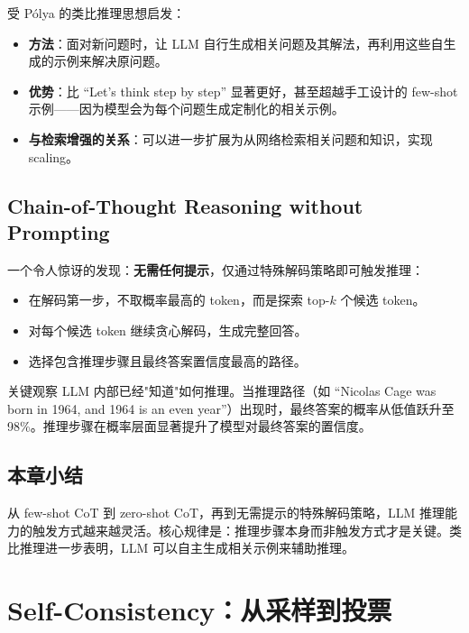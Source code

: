 \documentclass[a4paper]{article}
\begin{document}
受 P\'{o}lya 的类比推理思想启发：

\begin{itemize}
    \item \textbf{方法}：面对新问题时，让 LLM 自行生成相关问题及其解法，再利用这些自生成的示例来解决原问题。
    \item \textbf{优势}：比 ``Let's think step by step'' 显著更好，甚至超越手工设计的 few-shot 示例——因为模型会为每个问题生成定制化的相关示例。
    \item \textbf{与检索增强的关系}：可以进一步扩展为从网络检索相关问题和知识，实现 scaling。
\end{itemize}

\subsection{Chain-of-Thought Reasoning without Prompting}

一个令人惊讶的发现：\textbf{无需任何提示}，仅通过特殊解码策略即可触发推理：

\begin{itemize}
    \item 在解码第一步，不取概率最高的 token，而是探索 top-$k$ 个候选 token。
    \item 对每个候选 token 继续贪心解码，生成完整回答。
    \item 选择包含推理步骤且最终答案置信度最高的路径。
\end{itemize}

\begin{importantbox}{关键观察}
LLM 内部已经"知道"如何推理。当推理路径（如 ``Nicolas Cage was born in 1964, and 1964 is an even year''）出现时，最终答案的概率从低值跃升至 98\%。推理步骤在概率层面显著提升了模型对最终答案的置信度。
\end{importantbox}

\subsection{本章小结}

从 few-shot CoT 到 zero-shot CoT，再到无需提示的特殊解码策略，LLM 推理能力的触发方式越来越灵活。核心规律是：推理步骤本身而非触发方式才是关键。类比推理进一步表明，LLM 可以自主生成相关示例来辅助推理。

\section{Self-Consistency：从采样到投票}
\end{document}

